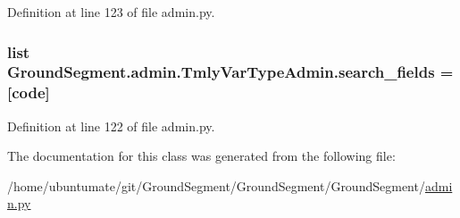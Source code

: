 Definition at line 123 of file admin.\+py.

\hypertarget{class_ground_segment_1_1admin_1_1_tmly_var_type_admin_aa4fbcc6eced9e293ccee1adc138c4728}{}
\subsubsection[{search\+\_\+fields}]{\setlength{\rightskip}{0pt plus 5cm}list Ground\+Segment.\+admin.\+Tmly\+Var\+Type\+Admin.\+search\+\_\+fields = \mbox{[}\textquotesingle{}code\textquotesingle{}\mbox{]}\hspace{0.3cm}{\ttfamily [static]}}\label{class_ground_segment_1_1admin_1_1_tmly_var_type_admin_aa4fbcc6eced9e293ccee1adc138c4728}


Definition at line 122 of file admin.\+py.



The documentation for this class was generated from the following file\+:\begin{DoxyCompactItemize}
\item 
/home/ubuntumate/git/\+Ground\+Segment/\+Ground\+Segment/\+Ground\+Segment/\hyperlink{admin_8py}{admin.\+py}\end{DoxyCompactItemize}
